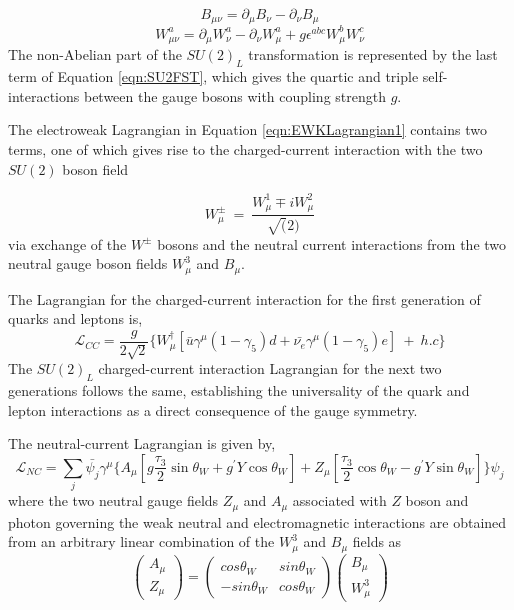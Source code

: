 \begin{equation}
B_{\mu\nu} = \partial_{\mu}B_{\nu} - \partial_{\nu}B_{\mu}
\label{eqn:U1YFST}
\end{equation}
\begin{equation}
W_{\mu\nu}^{a} = \partial_{\mu}W_{\nu}^{a} - \partial_{\nu}W_{\mu}^{a} + g\epsilon^{abc}W_{\mu}^{b}W_{\nu}^{c}
\label{eqn:SU2FST}
\end{equation}
The non-Abelian part of the $SU(2)_{L}$ transformation is represented by the last term of Equation \ref{eqn:SU2FST}, which gives the quartic and triple self-interactions between the gauge bosons with coupling strength $g$. 

The electroweak Lagrangian in Equation \ref{eqn:EWKLagrangian1} contains two terms, one of which gives rise to the charged-current interaction with the two $SU(2)$ boson field 

\begin{equation}
W^{\pm}_{\mu} ~=~ \frac{ W^{1}_{\mu} \mp iW^{2}_{\mu} } {\sqrt(2)}
\label{eqn:RealWBosons}
\end{equation}
via exchange of the $W^{\pm}$ bosons and the neutral current interactions from the two neutral gauge boson fields $W^{3}_{\mu}$ and $B_{\mu}$. 

The Lagrangian for the charged-current interaction for the first generation of quarks and leptons is, 
\begin{equation}
\mathcal{L}_{CC} = \frac{g}{2\sqrt{2}} \{ W^{\dagger}_{\mu} [\bar{u}\gamma^{\mu}(1-\gamma_{5})d + \bar{\nu_{e}}\gamma^{\mu}(1-\gamma_{5})e ]~+~h.c \}
\label{eqn:SU2CCLag}
\end{equation}
The $SU(2)_{L}$ charged-current interaction Lagrangian for the next two generations follows the same, establishing the universality of the quark and lepton interactions as a direct consequence of the gauge symmetry.

The neutral-current Lagrangian is given by, 
\begin{equation}
\mathcal{L}_{NC} = \sum_{j}{ \bar{\psi_{j}} \gamma^{\mu} \{ A_{\mu} [ g \frac{\tau_{3}}{2} \sin\theta_{W} + g^{'} Y \cos\theta_{W} ] + Z_{\mu} [ \frac{\tau_{3}}{2} \cos\theta_{W} - g^{'} Y \sin\theta_{W}] \} \psi_{j} }
\label{eqn:SU2NCLag}
\end{equation}
where the two neutral gauge fields $Z_{\mu}$ and $A_{\mu}$ associated with $Z$ boson and photon governing the weak neutral and electromagnetic interactions are obtained from an arbitrary linear combination of the $W^{3}_{\mu}$ and $B_{\mu}$ fields as 
\begin{equation}
\begin{pmatrix} A_{\mu} \\ Z_{\mu} \end{pmatrix} =  \begin{pmatrix} cos{\theta_{W}} & sin{\theta_{W}} \\ -sin{\theta_{W}} & cos{\theta_{W}} \end{pmatrix} \begin{pmatrix} B_{\mu} \\ W^{3}_{\mu} \end{pmatrix}
\label{eqn:NeutralGaugeBosons}
\end{equation}

